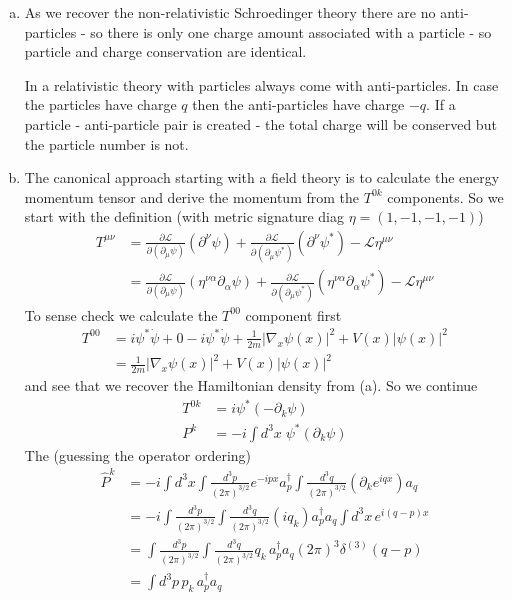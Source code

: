 \documentclass[10pt,a4paper]{report}
\theoremstyle{definition}
\begin{document}
\begin{enumerate}[a)]
\item As we recover the non-relativistic Schroedinger theory there are no anti-particles - so there is only one charge amount associated with a particle - so particle and charge conservation are identical.

In a relativistic theory with particles always come with anti-particles. In case the particles have charge $q$ then the anti-particles have charge $-q$. If a particle - anti-particle pair is created - the total charge will be conserved but the particle number is not. 

\item The canonical approach starting with a field theory is to calculate the energy momentum tensor and derive the momentum from the $T^{0k}$ components. So we start with the definition (with metric  signature diag $\eta=(1,-1,-1,-1)$)
\begin{align}
T^{\mu\nu}
&=\frac{\partial\mathcal{L}}{\partial(\partial_\mu\psi)}(\partial^\nu\psi)
+\frac{\partial\mathcal{L}}{\partial(\partial_\mu\psi^*)}(\partial^\nu\psi^*)-\mathcal{L}\eta^{\mu\nu}\\
&=\frac{\partial\mathcal{L}}{\partial(\partial_\mu\psi)}(\eta^{\nu\alpha}\partial_\alpha\psi)
+\frac{\partial\mathcal{L}}{\partial(\partial_\mu\psi^*)}(\eta^{\nu\alpha}\partial_\alpha\psi^*)-\mathcal{L}\eta^{\mu\nu}
\end{align}
To sense check we calculate the $T^{00}$ component first 
\begin{align}
T^{00}
&=i\psi^*\dot{\psi}+0-i\psi^*\dot{\psi}+\frac{1}{2m}|\nabla_x\psi(x)|^2+V(x)|\psi(x)|^2\\
&=\frac{1}{2m}|\nabla_x\psi(x)|^2+V(x)|\psi(x)|^2
\end{align}
and see that we recover the Hamiltonian density from (a). So we continue
\begin{align}
T^{0k}
&=i\psi^*(-\partial_k\psi)\\
P^k&=-i\int d^3x\; \psi^*(\partial_k\psi)
\end{align}
The (guessing the operator ordering)
\begin{align}
\hat{P}^k
&=-i\int d^3x
\int\frac{d^3p}{(2\pi)^{3/2}}e^{-ipx}a^\dagger_p
\int\frac{d^3q}{(2\pi)^{3/2}}(\partial_k e^{iqx})a_q\\
&=-i
\int\frac{d^3p}{(2\pi)^{3/2}}
\int\frac{d^3q}{(2\pi)^{3/2}}(iq_k)a^\dagger_pa_q\int d^3x\,e^{i(q-p)x}\\
&=
\int\frac{d^3p}{(2\pi)^{3/2}}
\int\frac{d^3q}{(2\pi)^{3/2}}q_k\,a^\dagger_pa_q(2\pi)^3\delta^{(3)}(q-p)\\
&=\int d^3p\,p_k\,a^\dagger_pa_q
\end{align}

\end{enumerate}
\newpage
\end{document}
